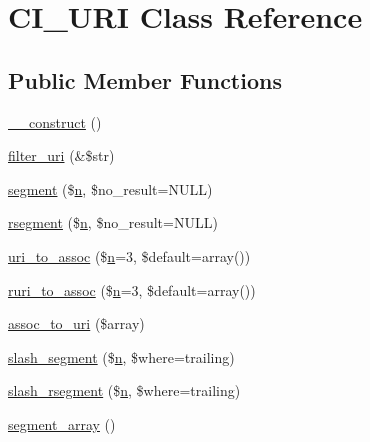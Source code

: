 \hypertarget{class_c_i___u_r_i}{}\section{C\+I\+\_\+\+U\+RI Class Reference}
\label{class_c_i___u_r_i}
\subsection*{Public Member Functions}
\begin{DoxyCompactItemize}
\item 
\mbox{\hyperlink{class_c_i___u_r_i_a095c5d389db211932136b53f25f39685}{\+\_\+\+\_\+construct}} ()
\item 
\mbox{\hyperlink{class_c_i___u_r_i_a0449aea4e186717ecbf1eacfc59fc5b6}{filter\+\_\+uri}} (\&\$str)
\item 
\mbox{\hyperlink{class_c_i___u_r_i_aeea297fbd38079886a2de35d633c1ed5}{segment}} (\$\mbox{\hyperlink{cli_2error__php_8php_a2e6b16bbc42094e4c51ade3c10afdcf1}{n}}, \$no\+\_\+result=N\+U\+LL)
\item 
\mbox{\hyperlink{class_c_i___u_r_i_a0fbd875ee8f8965b0b495b1dce0080fb}{rsegment}} (\$\mbox{\hyperlink{cli_2error__php_8php_a2e6b16bbc42094e4c51ade3c10afdcf1}{n}}, \$no\+\_\+result=N\+U\+LL)
\item 
\mbox{\hyperlink{class_c_i___u_r_i_a67cca74de71898ee88c167a265cff140}{uri\+\_\+to\+\_\+assoc}} (\$\mbox{\hyperlink{cli_2error__php_8php_a2e6b16bbc42094e4c51ade3c10afdcf1}{n}}=3, \$default=array())
\item 
\mbox{\hyperlink{class_c_i___u_r_i_a3f375a2026349f1fce7915966eba6d5b}{ruri\+\_\+to\+\_\+assoc}} (\$\mbox{\hyperlink{cli_2error__php_8php_a2e6b16bbc42094e4c51ade3c10afdcf1}{n}}=3, \$default=array())
\item 
\mbox{\hyperlink{class_c_i___u_r_i_a5c17149885c92fef1ed7f191f14a3f4d}{assoc\+\_\+to\+\_\+uri}} (\$array)
\item 
\mbox{\hyperlink{class_c_i___u_r_i_ac0b17861bb5ec6faf59d1157b9b60131}{slash\+\_\+segment}} (\$\mbox{\hyperlink{cli_2error__php_8php_a2e6b16bbc42094e4c51ade3c10afdcf1}{n}}, \$where=\textquotesingle{}trailing\textquotesingle{})
\item 
\mbox{\hyperlink{class_c_i___u_r_i_abeb00696116ba389fe26f3e49fd69ed5}{slash\+\_\+rsegment}} (\$\mbox{\hyperlink{cli_2error__php_8php_a2e6b16bbc42094e4c51ade3c10afdcf1}{n}}, \$where=\textquotesingle{}trailing\textquotesingle{})
\item 
\mbox{\hyperlink{class_c_i___u_r_i_ac0db37475b7a41e156f2e9375a2b7cc6}{segment\+\_\+array}} ()

\end{DoxyCompactItemize}
